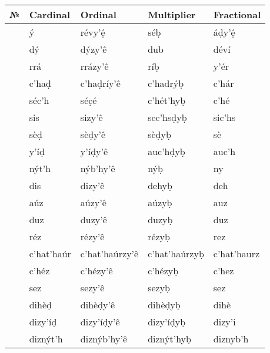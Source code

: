 \documentclass[a4paper, 12pt, twoside, final]{article}
\let \nf \normalfont
\begin{document}
{
\itshape
\begin{longtable}{>{\nf}l|l|l|l|l}
    \nf № & \nf Cardinal & \nf Ordinal & \nf Multiplier & \nf Fractional \\\hline
    1      & ý               & révy’ẹ́             & séḅ               & áḍy’ẹ́           \\
    2      & dý              & dýzy’ê             & dub               & déví            \\
    3      & rrá             & rrázy’ê            & ríḅ               & y’ér            \\
    4      & c’haḍ           & c’haḍríy’ê         & c’hadrýḅ          & c’hár           \\
    5      & séc’h           & séc̣é               & c’hét’hyḅ         & c’hé            \\
    6      & sis             & sizy’ê             & sec’hsḍyḅ         & sic’hs          \\
    7      & sèḍ             & sèḍy’ê             & sèḍyḅ             & sè              \\
    8      & y’íḍ            & y’íḍy’ê            & auc’hḍyḅ          & auc’h           \\
    9      & nýt’h           & nýb’hy’ê           & nýḅ               & ny              \\\hline
    10     & dis             & dizy’ê             & dehyḅ             & deh             \\
    11     & aúz             & aúzy’ê             & aúzyḅ             & auz             \\
    12     & duz             & duzy’ê             & duzyḅ             & duz             \\
    13     & réz             & rézy’ê             & rézyḅ             & rez             \\
    14     & c’hat’haúr      & c’hat’haúrzy’ê     & c’hat’haúrzyḅ     & c’hat’haurz     \\
    15     & c’héz           & c’hézy’ê           & c’hézyḅ           & c’hez           \\
    16     & sez             & sezy’ê             & sezyḅ             & sez             \\
    17     & dihèḍ           & dihèḍy’ê           & dihèḍyḅ           & dihè            \\
    18     & dizy’íḍ         & dizy’íḍy’ê         & dizy’íḍyḅ         & dizy’i          \\
    19     & diznýt’h        & diznýb’hy’ê        & diznýt’hyḅ        & diznyb’h        \\\hline

\end{longtable}}
\end{document}
